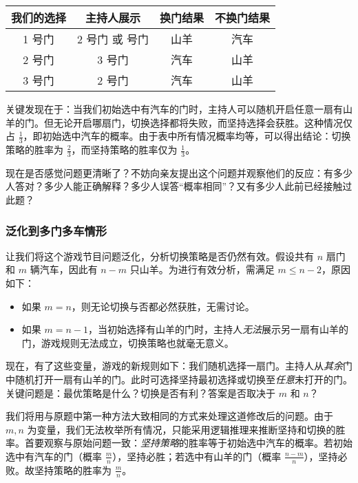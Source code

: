 \begin{center}
    \begin{tabular}{ c|c|c|c } 
     我们的选择 & 主持人展示 & 换门结果 & 不换门结果 \\ 
     \hline 
     1 号门    & 2 号门 \:或\: 3 号门  & 山羊 & 汽车 \\
     2 号门    & 3 号门            & 汽车 & 山羊 \\
     3 号门    & 2 号门            & 汽车 & 山羊 \\
    \end{tabular}
\end{center}

关键发现在于：当我们初始选中有汽车的门时，主持人可以随机开启任意一扇有山羊的门。但无论开启哪扇门，切换选择都将失败，而坚持选择会获胜。这种情况仅占 $\frac{1}{3}$，即初始选中汽车的概率。由于表中所有情况概率均等，可以得出结论：切换策略的胜率为 $\frac{2}{3}$，而坚持策略的胜率仅为 $\frac{1}{3}$。

现在是否感觉问题更清晰了？不妨向亲友提出这个问题并观察他们的反应：有多少人答对？多少人能正确解释？多少人误答``概率相同''？又有多少人此前已经接触过此题？

\subsubsection*{泛化到多门多车情形}

让我们将这个游戏节目问题泛化，分析切换策略是否仍然有效。假设共有 $n$ 扇门和 $m$ 辆汽车，因此有 $n - m$ 只山羊。为进行有效分析，需满足 $m \le n - 2$，原因如下：

\begin{itemize}
    \item 如果 $m = n$，则无论切换与否都必然获胜，无需讨论。
    \item 如果 $m = n-1$，当初始选择有山羊的门时，主持人\emph{无法}展示另一扇有山羊的门，游戏规则无法成立，切换策略也就毫无意义。
\end{itemize}

现在，有了这些变量，游戏的新规则如下：我们随机选择一扇门。主持人从\emph{其余}门中随机打开一扇有山羊的门。此时可选择坚持最初选择或切换至\emph{任意}未打开的门。关键问题是：最优策略是什么？切换是否有利？答案是否取决于 $m$ 和 $n$？

我们将用与原题中第一种方法大致相同的方式来处理这道修改后的问题。由于 $m,n$ 为变量，我们无法枚举所有情况，只能采用逻辑推理来推断坚持和切换的胜率。首要观察与原始问题一致：\emph{坚持策略}的胜率等于初始选中汽车的概率。若初始选中有汽车的门（概率 $\frac{m}{n}$），坚持必胜；若选中有山羊的门（概率 $\frac{n-m}{n}$），坚持必败。故坚持策略的胜率为 $\frac{m}{n}$。

